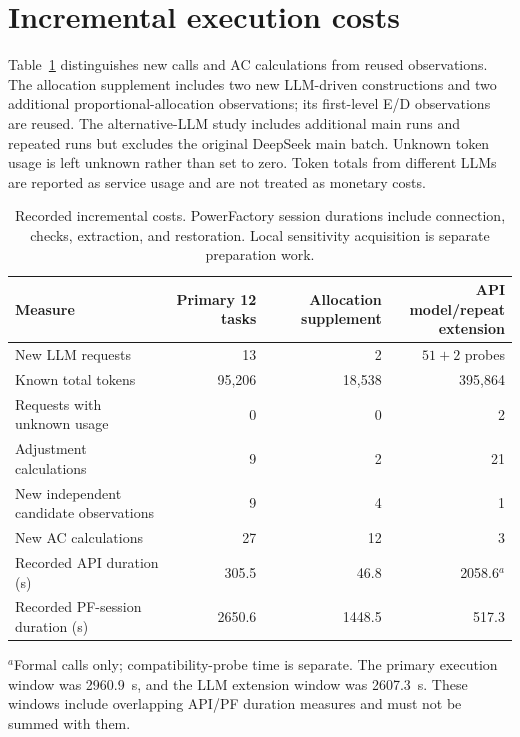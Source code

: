 \FloatBarrier
\section{Incremental execution costs}
\label{app:costs}

Table~\ref{tab:costs} distinguishes new calls and AC calculations from reused observations. The allocation supplement includes two new LLM-driven constructions and two additional proportional-allocation observations; its first-level E/D observations are reused. The alternative-LLM study includes additional main runs and repeated runs but excludes the original DeepSeek main batch. Unknown token usage is left unknown rather than set to zero. Token totals from different LLMs are reported as service usage and are not treated as monetary costs.

\begin{table}[htbp]
\caption{Recorded incremental costs. PowerFactory session durations include connection, checks, extraction, and restoration. Local sensitivity acquisition is separate preparation work.}
\label{tab:costs}
\small
\begin{tabularx}{\linewidth}{@{}Xrrr@{}}
\toprule
Measure & Primary 12 tasks & Allocation supplement & \makecell{API model/repeat\\extension} \\
\midrule
New LLM requests & 13 & 2 & $51+2$ probes \\
Known total tokens & 95,206 & 18,538 & 395,864 \\
Requests with unknown usage & 0 & 0 & 2 \\
Adjustment calculations & 9 & 2 & 21 \\
New independent candidate observations & 9 & 4 & 1 \\
New AC calculations & 27 & 12 & 3 \\
Recorded API duration (s) & 305.5 & 46.8 & 2058.6$^{a}$ \\
Recorded PF-session duration (s) & 2650.6 & 1448.5 & 517.3 \\
\bottomrule
\end{tabularx}
\par\smallskip\footnotesize $^{a}$Formal calls only; compatibility-probe time is separate. The primary execution window was 2960.9~s, and the LLM extension window was 2607.3~s. These windows include overlapping API/PF duration measures and must not be summed with them.
\end{table}

